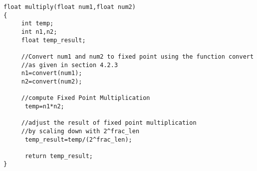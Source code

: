 \lstset{framesep=-10pt, xleftmargin=-10pt}
\begin{lstlisting}[caption={Sample Code for Fixed Multiplication},label={listing:4}]
float multiply(float num1,float num2)
{
     int temp;
     int n1,n2;
     float temp_result; 
     
     //Convert num1 and num2 to fixed point using the function convert
     //as given in section 4.2.3
     n1=convert(num1); 
     n2=convert(num2);
    
     //compute Fixed Point Multiplication
      temp=n1*n2;
      
     //adjust the result of fixed point multiplication
     //by scaling down with 2^frac_len
      temp_result=temp/(2^frac_len);
      
      return temp_result;
}
\end{lstlisting}

